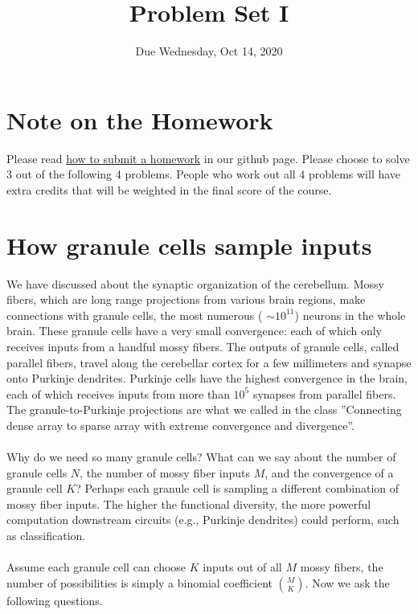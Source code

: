 \documentclass{article}
\title{Problem Set I}
\date{Due Wednesday, Oct  14, 2020}
\begin{document}
\maketitle

\section*{Note on the Homework}

Please read \href{https://github.com/Wenlab/Computation-Neuro-Course/wiki/%E4%BD%9C%E4%B8%9A%E6%8F%90%E4%BA%A4}{how to submit a homework} in our github page.
Please choose to solve 3 out of the following 4 problems. People who work out all 4 problems will have extra credits that will be weighted in the final score of the course. 

\section*{How granule cells sample inputs}

We have discussed about the synaptic organization of the cerebellum. Mossy fibers, which are long range projections from various brain regions, make connections with granule cells, the most numerous ( $ \sim 10^{11}$) neurons in the whole brain. These granule cells have a very small convergence: each of which only receives inputs from a handful mossy fibers. The outputs of granule cells, called parallel fibers, travel along the cerebellar cortex for a few millimeters and synapse onto Purkinje dendrites. Purkinje cells have the highest convergence in the brain, each of which receives inputs from more than $10^5$ synapses from parallel fibers. The granule-to-Purkinje projections are what we called in the class ”Connecting dense array to sparse array with extreme convergence and divergence”.
\\
\\
Why do we need so many granule cells? What can we say about the number of granule cells $N$, the number of mossy fiber inputs $M$, and the convergence of a granule cell $K$? Perhaps each granule cell is sampling a different combination of mossy fiber inputs. The higher the functional diversity, the more powerful computation downstream circuits (e.g., Purkinje dendrites) could perform, such as classification.
\\
\\
Assume each granule cell can choose $K$ inputs out of all $M$ mossy fibers, the number of possibilities is simply a binomial coefficient $\binom{M}{K}$. Now we ask the following questions.
\end{document}
